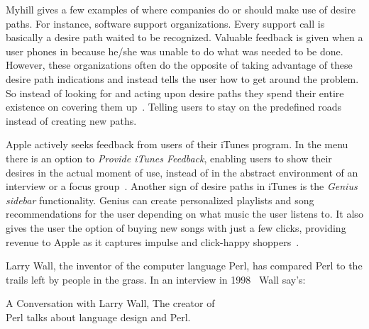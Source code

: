 \documentclass[a4paper]{report}
\begin{document}
Myhill gives a few examples of where companies do or should make use of desire paths. For instance, software support organizations. Every support call is basically a desire path waited to be recognized. Valuable feedback is given when a user phones in because he/she was unable to do what was needed to be done. However, these organizations often do the opposite of taking advantage of these desire path indications and instead tells the user how to get around the problem. So instead of looking for and acting upon desire paths they spend their entire existence on covering them up~\cite{Myhill:2004}. Telling users to stay on the predefined roads instead of creating new paths.

Apple actively seeks feedback from users of their iTunes program. In the menu there is an option to \emph{Provide iTunes Feedback}, enabling users to show their desires in the actual moment of use, instead of in the abstract environment of an interview or a focus group~\cite{Myhill:2004}. Another sign of desire paths in iTunes is the \emph{Genius sidebar} functionality. Genius can create personalized playlists and song recommendations for the user depending on what music the user listens to. It also gives the user the option of buying new songs with just a few clicks, providing revenue to Apple as it captures impulse and click-happy shoppers~\cite{Murphy:2008}.

Larry Wall, the inventor of the computer language Perl, has compared Perl to the trails left by people in the grass. In an interview in 1998~\cite{Dobb:1998} Wall say's:

	{A Conversation with Larry Wall, The creator of\\Perl talks about language design and Perl.~\cite{Dobb:1998}}
\end{document}
